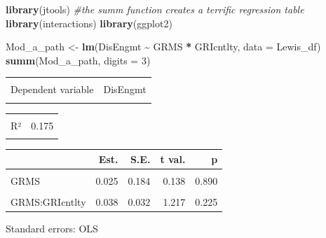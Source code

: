\documentclass[
  11pt,
]{book}
\newenvironment{Shaded}{\begin{snugshade}}{\end{snugshade}}
\newcommand{\AttributeTok}[1]{\textcolor[rgb]{0.27,0.27,0.27}{#1}}
\newcommand{\CommentTok}[1]{\textcolor[rgb]{0.37,0.37,0.37}{\textit{#1}}}
\newcommand{\DecValTok}[1]{\textcolor[rgb]{0.06,0.06,0.06}{#1}}
\newcommand{\FunctionTok}[1]{\textcolor[rgb]{0.27,0.27,0.27}{\textbf{#1}}}
\newcommand{\NormalTok}[1]{#1}
\newcommand{\OtherTok}[1]{\textcolor[rgb]{0.37,0.37,0.37}{#1}}
\newcommand{\SpecialCharTok}[1]{\textcolor[rgb]{0.43,0.43,0.43}{\textbf{#1}}}
\begin{document}
\begin{Shaded}
\begin{Highlighting}[]
\FunctionTok{library}\NormalTok{(jtools)  }\CommentTok{\#the summ function creates a terrific regression table}
\FunctionTok{library}\NormalTok{(interactions)}
\FunctionTok{library}\NormalTok{(ggplot2)}

\NormalTok{Mod\_a\_path }\OtherTok{\textless{}{-}} \FunctionTok{lm}\NormalTok{(DisEngmt }\SpecialCharTok{\textasciitilde{}}\NormalTok{ GRMS }\SpecialCharTok{*}\NormalTok{ GRIcntlty, }\AttributeTok{data =}\NormalTok{ Lewis\_df)}
\FunctionTok{summ}\NormalTok{(Mod\_a\_path, }\AttributeTok{digits =} \DecValTok{3}\NormalTok{)}
\end{Highlighting}
\end{Shaded}

\begin{table}[!h]
\centering
\begin{tabular}{lr}
\toprule
\cellcolor{gray!6}{Observations} & \cellcolor{gray!6}{212}\\
Dependent variable & DisEngmt\\
\cellcolor{gray!6}{Type} & \cellcolor{gray!6}{OLS linear regression}\\
\bottomrule
\end{tabular}
\end{table} \begin{table}[!h]
\centering
\begin{tabular}{lr}
\toprule
\cellcolor{gray!6}{F(3,208)} & \cellcolor{gray!6}{14.685}\\
R² & 0.175\\
\cellcolor{gray!6}{Adj. R²} & \cellcolor{gray!6}{0.163}\\
\bottomrule
\end{tabular}
\end{table} \begin{table}[!h]
\centering
\begin{threeparttable}
\begin{tabular}{lrrrr}
\toprule
  & Est. & S.E. & t val. & p\\
\midrule
\cellcolor{gray!6}{(Intercept)} & \cellcolor{gray!6}{1.796} & \cellcolor{gray!6}{0.415} & \cellcolor{gray!6}{4.325} & \cellcolor{gray!6}{0.000}\\
GRMS & 0.025 & 0.184 & 0.138 & 0.890\\
\cellcolor{gray!6}{GRIcntlty} & \cellcolor{gray!6}{-0.095} & \cellcolor{gray!6}{0.073} & \cellcolor{gray!6}{-1.290} & \cellcolor{gray!6}{0.199}\\
GRMS:GRIcntlty & 0.038 & 0.032 & 1.217 & 0.225\\
\bottomrule
\end{tabular}
\begin{tablenotes}
\item Standard errors: OLS
\end{tablenotes}
\end{threeparttable}
\end{table}
\end{document}
